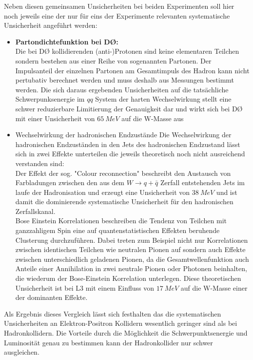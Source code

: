 \documentclass[a4paper,12pt]{article}
\begin{document}
Neben diesen gemeinsamen Unsicherheiten bei beiden Experimenten soll hier noch jeweils eine der nur für eins der Experimente relevanten
systematische Unsicherheit angeführt werden:
\begin{itemize}
	\item \textbf{Partondichtefunktion bei DØ:}\\
	Die bei DØ kollidierenden (anti-)Protonen sind keine elementaren Teilchen sondern bestehen aus einer Reihe von sogenannten Partonen. Der
	Impulsanteil der einzelnen Partonen am Gesamtimpuls des Hadron kann nicht pertubativ berechnet werden und muss deshalb aus Messungen bestimmt
	werden. Die sich daraus ergebenden Unsicherheiten auf die tatsächliche Schwerpunksenergie im $qq$ System der harten Wechselwirkung stellt eine
	schwer reduzierbare Limitierung der Genauigkeit dar und wirkt sich bei DØ mit einer Unsicherheit von $\SI{65}{MeV}$ auf die W-Masse aus
	\item {Wechselwirkung der hadronischen Endzustände}
	Die Wechselwirkung der hadronischen Endzuständen in den Jets des hadronischen Endzustand lässt sich in zwei Effekte unterteilen die jeweils
	theoretisch noch nicht ausreichend verstanden sind: \\
	Der Effekt der sog. "Colour reconnection" beschreibt den Austausch von Farbladungen zwischen
	den aus dem $W\rightarrow q+\bar{q}$ Zerfall entstehenden Jets im laufe der Hadronisation und erzeugt eine Unsicherheit von $\SI{38}{MeV}$
	und ist damit die dominierende systematische Unsicherheit für den hadronischen Zerfallskanal.\\
	Bose Einstein Korrelationen beschreiben die Tendenz von Teilchen mit ganzzahligem Spin eine auf quantenstatistischen Effekten beruhende Clusterung
	durchzuführen. Dabei treten zum Beispiel nicht nur Korrelationen zwischen identischen Teilchen wie neutralen Pionen auf sondern auch Effekte zwischen
	unterschiedlich geladenen Pionen, da die Gesamtwellenfunktion auch Anteile einer Annihilation in
	zwei neutrale Pionen oder Photonen beinhalten, die
	wiederum der Bose-Einstein Korrelation unterlegen. Diese theoretischen Unsicherheit ist bei L3 mit einem Einfluss von $\SI{17}{MeV}$ auf die W-Masse
	einer der dominanten Effekte.
\end{itemize}
Als Ergebnis dieses Vergleich lässt sich festhalten das die systematischen Unsicherheiten an Elektron-Positron Kollidern wesentlich geringer sind als
bei Hadronkollidern. Die Vorteile durch die Möglichkeit die Schwerpunktsenergie und Luminosität genau zu bestimmen kann der Hadronkollider nur schwer ausgleichen.


{}
\end{document}
